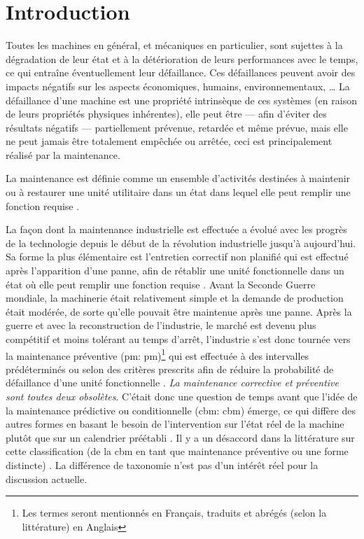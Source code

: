 \chapter*{Introduction}

Toutes les machines en général, et mécaniques en particulier, sont sujettes à la dégradation de leur état et à la détérioration de leurs performances avec le temps, ce qui entraîne éventuellement leur défaillance. Ces défaillances peuvent avoir des impacts négatifs sur les aspects économiques, humains, environnementaux, …
La défaillance d’une machine est une propriété intrinsèque de ces systèmes (en raison de leurs propriétés physiques inhérentes), elle peut être — afin d’éviter des résultats négatifs — partiellement prévenue, retardée et même prévue, mais elle ne peut jamais être totalement empêchée ou arrêtée, ceci est principalement réalisé par la maintenance.

La maintenance est définie comme un ensemble d’activités destinées à maintenir ou à restaurer une unité utilitaire dans un état dans lequel elle peut remplir une fonction requise \cite{ISO2015}.

La façon dont la maintenance industrielle est effectuée a évolué avec les progrès de la technologie depuis le début de la révolution industrielle jusqu’à aujourd’hui. Sa forme la plus élémentaire est l’entretien correctif non planifié qui est effectué après l’apparition d’une panne, afin de rétablir une unité fonctionnelle dans un état où elle peut remplir une fonction requise \cite{ISO2015}. Avant la Seconde Guerre mondiale, la machinerie était relativement simple et la demande de production était modérée, de sorte qu’elle pouvait être maintenue après une panne. Après la guerre et avec la reconstruction de l’industrie, le marché est devenu plus compétitif et moins tolérant au temps d’arrêt, l’industrie s’est donc tournée vers la maintenance préventive (\acrlong{pm}: \acrshort{pm})\footnote{Les termes seront mentionnés en Français, traduits et abrégés (selon la littérature) en Anglais} qui est effectuée à des intervalles prédéterminés ou selon des critères prescrits afin de réduire la probabilité de défaillance d’une unité fonctionnelle \cite{ISO2015}.  \textit{La maintenance corrective et préventive sont toutes deux obsolètes}. %
C’était donc une question de temps avant que l’idée de la maintenance prédictive ou conditionnelle (\acrlong{cbm}: \acrshort{cbm}) émerge, ce qui diffère des autres formes en basant le besoin de l'intervention sur l’état réel de la machine plutôt que sur un calendrier préétabli \cite{Kadry2013}. Il y a un désaccord dans la littérature sur cette classification (de la \acrshort{cbm} en tant que maintenance préventive ou une forme distincte) \cite{Shin2015}. La différence de taxonomie n’est pas d’un intérêt réel pour la discussion actuelle.

